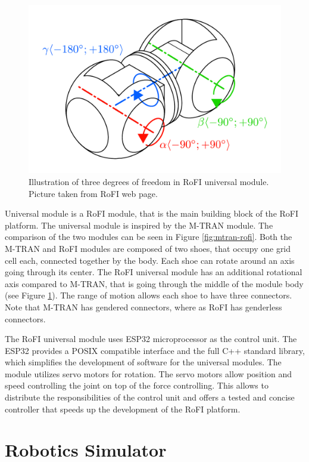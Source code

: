 \documentclass[
  digital, %
  table,   %
  oneside, %
  nolof,     %
  nolot,     %
]{fithesis3}
\begin{document}
\begin{figure}
    \centering
    \includegraphics[height=.4\textheight]{data/rofi_universal_module_dof.pdf}
    \caption{Illustration of three degrees of freedom in RoFI universal module. Picture taken from RoFI web page\cite{rofi-web}.}
    \label{fig:univ-module-dof}
\end{figure}

Universal module is a RoFI module, that is the main building block of the RoFI platform.
The universal module is inspired by the M-TRAN\cite{mtran} module.
The comparison of the two modules can be seen in Figure \ref{fig:mtran-rofi}.
Both the M-TRAN and RoFI modules are composed of two shoes, that occupy one grid cell each, connected together by the body.
Each shoe can rotate around an axis going through its center.
The RoFI universal module has an additional rotational axis compared to M-TRAN, that is going through the middle of the module body (see Figure \ref{fig:univ-module-dof}).
The range of motion allows each shoe to have three connectors.
Note that M-TRAN has gendered connectors, where as RoFI has genderless connectors.

The RoFI universal module uses ESP32 microprocessor as the control unit.
The ESP32 provides a POSIX compatible interface and the full C++ standard library, which simplifies the development of software for the universal modules.
The module utilizes servo motors for rotation.
The servo motors allow position and speed controlling the joint on top of the force controlling.
This allows to distribute the responsibilities of the control unit and offers a tested and concise controller that speeds up the development of the RoFI platform.


\chapter{Robotics Simulator}
\end{document}
